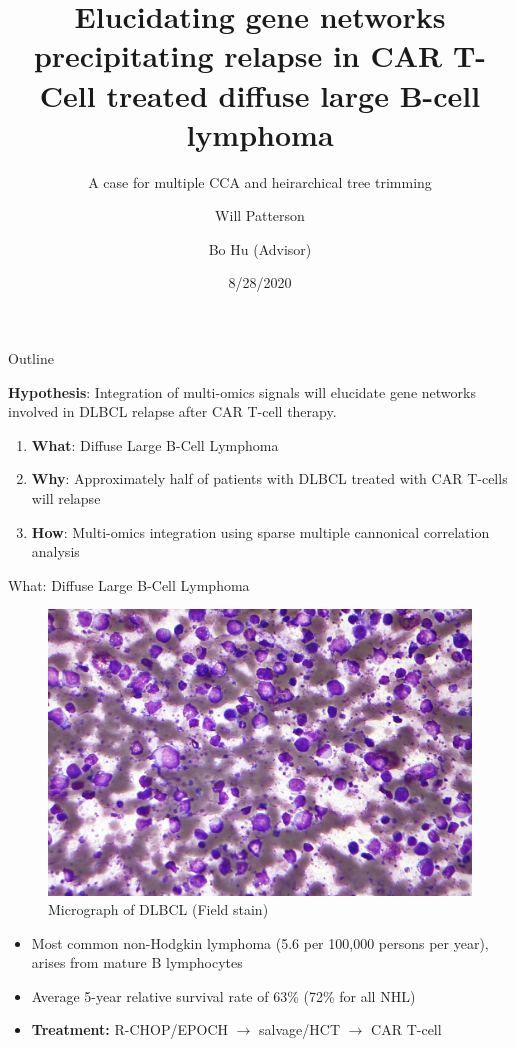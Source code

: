 \documentclass[ignorenonframetext,]{beamer}
\title{Elucidating gene networks precipitating relapse in CAR T-Cell treated
diffuse large B-cell lymphoma}
\subtitle{A case for multiple CCA and heirarchical tree trimming}
\author{Will Patterson \and Bo Hu (Advisor)}
\institute{Cleveland Clinic Lerner College of Medicine}
\date{8/28/2020}
\begin{document}
\frame{\titlepage}

\begin{frame}{Outline}
\protect\hypertarget{outline}{}

\textbf{Hypothesis}: Integration of multi-omics signals will elucidate
gene networks involved in DLBCL relapse after CAR T-cell therapy.

\begin{enumerate}
\item
  \textbf{What}: Diffuse Large B-Cell Lymphoma
\item
  \textbf{Why}: Approximately half of patients with DLBCL treated with
  CAR T-cells will relapse
\item
  \textbf{How}: Multi-omics integration using sparse multiple cannonical
  correlation analysis
\end{enumerate}

\end{frame}

\begin{frame}{What: Diffuse Large B-Cell Lymphoma}
\protect\hypertarget{what-diffuse-large-b-cell-lymphoma}{}

\begin{figure}

{\centering \includegraphics[width=0.45\linewidth]{images/dlbcl_stain} 

}

\caption{Micrograph of DLBCL (Field stain)}\label{fig:unnamed-chunk-1}
\end{figure}

\begin{itemize}
\item
  Most common non-Hodgkin lymphoma (5.6 per 100,000 persons per year),
  arises from mature B lymphocytes
\item
  Average 5-year relative survival rate of 63\% (72\% for all NHL)
\item
  \textbf{Treatment:} R-CHOP/EPOCH \(\rightarrow\) salvage/HCT
  \(\rightarrow\) CAR T-cell
\end{itemize}

\end{frame}
\end{document}
